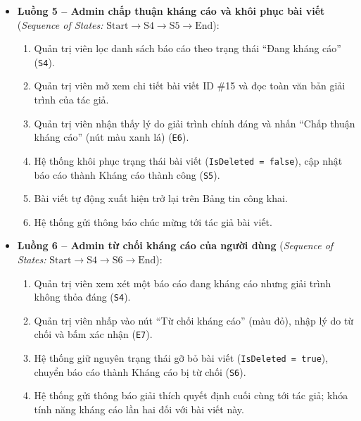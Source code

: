 \documentclass[11pt,a4paper]{article}
\begin{document}
\begin{itemize}[leftmargin=1.2cm, noitemsep]
    \item[\textbf{--}] \textbf{Luồng 5 -- Admin chấp thuận kháng cáo và khôi phục bài viết} (\textit{Sequence of States:} $\text{Start} \rightarrow \text{S4} \rightarrow \text{S5} \rightarrow \text{End}$):
    \begin{enumerate}[leftmargin=0.7cm, noitemsep]
        \item Quản trị viên lọc danh sách báo cáo theo trạng thái ``Đang kháng cáo'' (\texttt{S4}).
        \item Quản trị viên mở xem chi tiết bài viết ID \#15 và đọc toàn văn bản giải trình của tác giả.
        \item Quản trị viên nhận thấy lý do giải trình chính đáng và nhấn ``Chấp thuận kháng cáo'' (nút màu xanh lá) (\texttt{E6}).
        \item Hệ thống khôi phục trạng thái bài viết (\texttt{IsDeleted = false}), cập nhật báo cáo thành Kháng cáo thành công (\texttt{S5}).
        \item Bài viết tự động xuất hiện trở lại trên Bảng tin công khai.
        \item Hệ thống gửi thông báo chúc mừng tới tác giả bài viết.
    \end{enumerate}

    \item[\textbf{--}] \textbf{Luồng 6 -- Admin từ chối kháng cáo của người dùng} (\textit{Sequence of States:} $\text{Start} \rightarrow \text{S4} \rightarrow \text{S6} \rightarrow \text{End}$):
    \begin{enumerate}[leftmargin=0.7cm, noitemsep]
        \item Quản trị viên xem xét một báo cáo đang kháng cáo nhưng giải trình không thỏa đáng (\texttt{S4}).
        \item Quản trị viên nhấp vào nút ``Từ chối kháng cáo'' (màu đỏ), nhập lý do từ chối và bấm xác nhận (\texttt{E7}).
        \item Hệ thống giữ nguyên trạng thái gỡ bỏ bài viết (\texttt{IsDeleted = true}), chuyển báo cáo thành Kháng cáo bị từ chối (\texttt{S6}).
        \item Hệ thống gửi thông báo giải thích quyết định cuối cùng tới tác giả; khóa tính năng kháng cáo lần hai đối với bài viết này.
    \end{enumerate}


\end{itemize}
\end{document}
